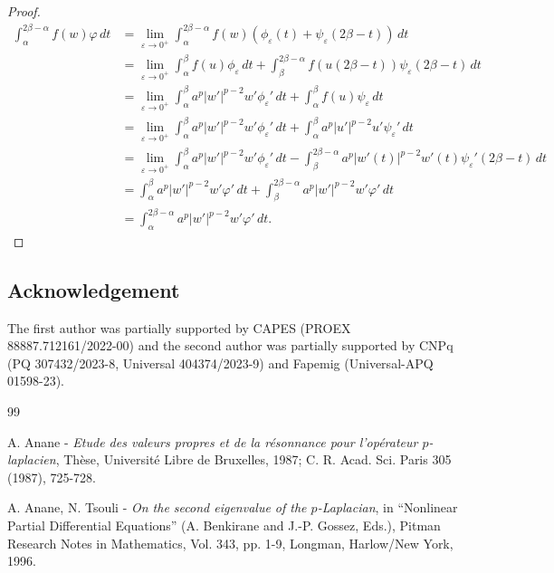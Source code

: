 \documentclass[a4paper,11pt]{article}
\begin{document}
{\begin{proof}
\begin{align*}
\int_{\alpha}^{2\beta - \alpha} f(w)\varphi \, dt &= \lim_{\varepsilon \to 0^{+}} \int_{\alpha}^{2\beta - \alpha} f(w) \left(\phi_{\varepsilon}(t) + \psi_{\varepsilon}(2\beta - t)\right) \, dt \\
&= \lim_{\varepsilon \to 0^{+}} \int_{\alpha}^{\beta}f(u)\phi_{\varepsilon} \, dt + \int_{\beta}^{2\beta - \alpha} f(u(2\beta - t))\psi_{\varepsilon}(2\beta - t) \, dt \\
&= \lim_{\varepsilon \to 0^{+}}\int_{\alpha}^{\beta} a^{p}|w'|^{p-2} w' \phi_{\varepsilon}' \, dt + \int_{\alpha}^{\beta} f(u) \psi_{\varepsilon} \, dt \\
&= \lim_{\varepsilon \to 0^{+}}\int_{\alpha}^{\beta} a^{p} |w'|^{p-2} w' \phi_{\varepsilon}' \, dt + \int_{\alpha}^{\beta} a^{p}|u'|^{p-2}u'\psi_{\varepsilon}' \, dt \\
&= \lim_{\varepsilon \to 0^{+}}\int_{\alpha}^{\beta} a^{p}|w'|^{p-2} w' \phi_{\varepsilon}' \, dt - \int_{\beta}^{2\beta - \alpha} a^{p} |w'(t)|^{p-2} w'(t) \psi_{\varepsilon}'(2\beta - t) \,dt \\
&= \int_{\alpha}^{\beta} a^{p}|w'|^{p-2} w'\varphi' \, dt + \int_{\beta}^{2\beta - \alpha} a^{p}|w'|^{p-2} w' \varphi' \, dt \\
&= \int_{\alpha}^{2\beta - \alpha} a^{p} |w'|^{p-2} w'\varphi' \, dt.
\end{align*}
\end{proof}

\subsection*{Acknowledgement}

The first author was partially supported by CAPES (PROEX 88887.712161/2022-00) and the second author was partially supported by CNPq (PQ 307432/2023-8, Universal 404374/2023-9) and Fapemig (Universal-APQ 01598-23).

\begin{thebibliography}{99}


{A. Anane} - \textit{Etude des valeurs propres et de la résonnance pour l'opérateur $p$-laplacien}, Thèse, Université Libre de Bruxelles, 1987; C. R. Acad. Sci. Paris 305 (1987), 725-728.

{A. Anane, N. Tsouli} - \textit{On the second eigenvalue of the $p$-Laplacian}, in ``Nonlinear Partial Differential Equations'' (A. Benkirane and J.-P. Gossez, Eds.), Pitman Research Notes in Mathematics, Vol. 343, pp. 1-9, Longman, Harlow/New York, 1996.


\end{thebibliography}}
\end{document}
